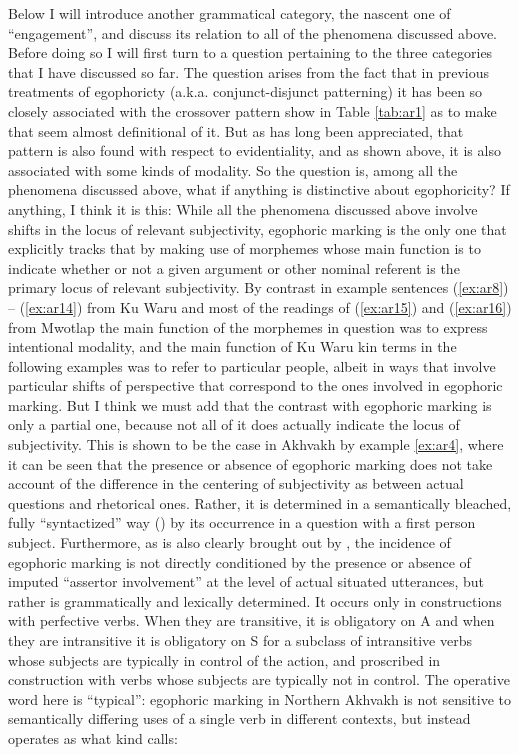 \documentclass[output=paper]{langsci/langscibook}
\begin{document}
Below I will introduce another grammatical category, the nascent one of “engagement”, and discuss its relation to all of the phenomena discussed above. Before doing so I will first turn to a question pertaining to the three categories that I have discussed so far. The question arises from the fact that in previous treatments of egophoricty (a.k.a. conjunct-disjunct patterning) it has been so closely associated with the crossover pattern show in Table \ref{tab:ar1} as to make that seem almost definitional of it. But as has long been appreciated, that pattern is also found with respect to evidentiality, and as shown above, it is also associated with some kinds of modality. So the question is, among all the phenomena discussed above, what if anything is distinctive about egophoricity?  If anything, I think it is this:  While all the phenomena discussed above involve shifts in the locus of relevant subjectivity, egophoric marking is the only one that explicitly tracks that by making use of morphemes whose main function is to indicate whether or not a given argument or other nominal referent is the primary locus of relevant subjectivity.  
By contrast in example sentences (\ref{ex:ar8}) – (\ref{ex:ar14}) from Ku Waru and most of the readings of (\ref{ex:ar15}) and (\ref{ex:ar16}) from Mwotlap the main function of the morphemes in question was to express intentional modality, and the main function of Ku Waru kin terms in the following examples was to refer to particular people, albeit in ways that involve particular shifts of perspective that correspond to the ones involved in egophoric marking. But I think we must add that the contrast with egophoric marking is only a partial one, because not all of it does actually indicate the locus of subjectivity. This is shown to be the case in Akhvakh by example \ref{ex:ar4}, where it can be seen that the presence or absence of egophoric marking does not take account of the difference in the centering of subjectivity as between actual questions and rhetorical ones. Rather, it is determined in a semantically bleached, fully “syntactized” way (\citealt[11]{Creissels2008}) by its occurrence in a question with a first person subject. Furthermore, as is also clearly brought out by \citeauthor{Creissels2008}, the incidence of egophoric marking is not directly conditioned by the presence or absence of imputed “assertor involvement” at the level of actual situated utterances, but rather is grammatically and lexically determined.  It occurs only in constructions with perfective verbs.  When they are transitive, it is obligatory on A and when they are intransitive it is obligatory on S for a subclass of intransitive verbs whose subjects are typically in control of the action, and proscribed in construction with verbs whose subjects are typically not in control. The operative word here is “typical”:  egophoric marking in Northern Akhvakh is not sensitive to semantically differing uses of a single verb in different contexts, but instead operates as what kind \citeauthor{Creissels2008} calls:
\end{document}
